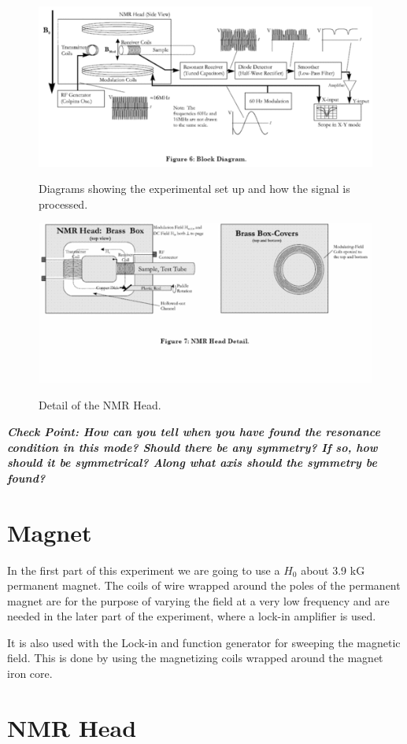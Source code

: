 \documentclass{../lab}
\begin{document}
\begin{figure}[h]
    \centering
    \href{http://experimentationlab.berkeley.edu/sites/default/files/images/500px-NMR10.gif}{\includegraphics[width=0.5\linewidth]{images/500px-NMR10.png}}
    \caption{Diagrams showing the experimental set up and how the signal is processed.}
    \label{fig:500px-NMR10}
\end{figure}

\begin{figure}[h]
    \centering
    \href{http://experimentationlab.berkeley.edu/sites/default/files/images/500px-NMR11.gif}{\includegraphics[width=0.5\linewidth]{images/500px-NMR11.png}}
    \caption{Detail of the NMR Head.}
    \label{fig:DetailOfNMRHead}
\end{figure}

\emph{\textbf{Check Point: How can you tell when you have found the resonance condition in this mode? Should there be any symmetry? If so, how should it be symmetrical? Along what axis should the symmetry be found?}}

\section{Magnet}

In the first part of this experiment we are going to use a $H_0$ about 3.9 kG permanent magnet. The coils of wire wrapped around the poles of the permanent magnet are for the purpose of varying the field at a very low frequency and are needed in the later part of the experiment, where a lock-in amplifier is used.

It is also used with the Lock-in and function generator for sweeping the magnetic field. This is done by using the magnetizing coils wrapped around the magnet iron core.

\section{NMR Head}
\end{document}
